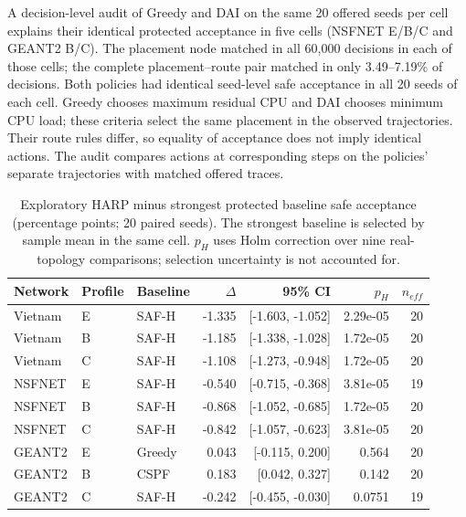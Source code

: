 \documentclass[final,5p]{elsarticle}
\newcommand{\rev}[1]{\textcolor{revisiongreen}{#1}}
\let\newrev\rev
\begin{document}
\newrev{A decision-level audit of Greedy and DAI on the same 20 offered seeds per cell explains their identical protected acceptance in five cells (NSFNET E/B/C and GEANT2 B/C). The placement node matched in all 60,000 decisions in each of those cells; the complete placement--route pair matched in only 3.49--7.19\% of decisions. Both policies had identical seed-level safe acceptance in all 20 seeds of each cell. Greedy chooses maximum residual CPU and DAI chooses minimum CPU load; these criteria select the same placement in the observed trajectories. Their route rules differ, so equality of acceptance does not imply identical actions. The audit compares actions at corresponding steps on the policies' separate trajectories with matched offered traces.}

\begin{table}[t]
\centering
\caption{Exploratory HARP minus strongest protected baseline safe acceptance (percentage points; 20 paired seeds). The strongest baseline is selected by sample mean in the same cell. $p_H$ uses Holm correction over nine real-topology comparisons; selection uncertainty is not accounted for.}
\label{tab:best_baseline_exploratory}
\scriptsize
\begin{tabular}{lllrrrr}
\toprule
Network & Profile & Baseline & $\Delta$ & 95\% CI & $p_H$ & $n_{eff}$ \\
\midrule
Vietnam & E & SAF-H & -1.335 & [-1.603, -1.052] & 2.29e-05 & 20 \\
Vietnam & B & SAF-H & -1.185 & [-1.338, -1.028] & 1.72e-05 & 20 \\
Vietnam & C & SAF-H & -1.108 & [-1.273, -0.948] & 1.72e-05 & 20 \\
NSFNET & E & SAF-H & -0.540 & [-0.715, -0.368] & 3.81e-05 & 19 \\
NSFNET & B & SAF-H & -0.868 & [-1.052, -0.685] & 1.72e-05 & 20 \\
NSFNET & C & SAF-H & -0.842 & [-1.057, -0.623] & 3.81e-05 & 20 \\
GEANT2 & E & Greedy & 0.043 & [-0.115, 0.200] & 0.564 & 20 \\
GEANT2 & B & CSPF & 0.183 & [0.042, 0.327] & 0.142 & 20 \\
GEANT2 & C & SAF-H & -0.242 & [-0.455, -0.030] & 0.0751 & 19 \\

\bottomrule
\end{tabular}
\end{table}
\end{document}
